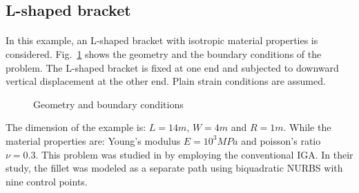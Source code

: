 \subsection{L-shaped bracket}
\label{subsection:l_shaped_bracket}
\paragraph{}
In this example, an L-shaped bracket with isotropic material properties is considered.
Fig.~\ref{iso_fig:l_with_fillet_geo_bc} shows the geometry and the boundary conditions of the problem.
The L-shaped bracket is fixed at one end and subjected to downward vertical displacement at the other end.
Plain strain conditions are assumed.
    \begin{figure}[h!]
        \centering
        \caption{Geometry and boundary conditions} 
        \label{iso_fig:l_with_fillet_geo_bc}         
    \end{figure}
%
The dimension of the example is: $L=14m$, $W=4m$ and $R=1m$.
While the material properties are: Young's modulus $E=10^3MPa$ and poisson's ratio $\nu=0.3$.
This problem was studied in \citep{LIPTON2010357} by employing the conventional IGA.
In their study, the fillet was modeled as a separate path using biquadratic NURBS with nine control points.

